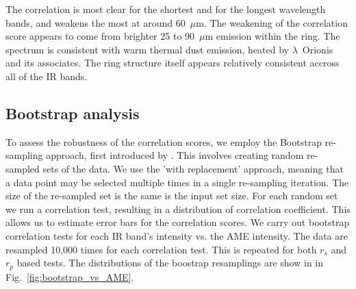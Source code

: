             The correlation is most clear for the shortest and for the longest wavelength bands, and weakens the most at around 60~$\mu$m. The weakening of the correlation score appears to come from brighter 25 to 90~$\mu$m emission within the ring. The spectrum is consistent with warm thermal dust emission, heated by $\lambda$~Orionis and its associates. The ring structure itself appears relatively consistent accross all of the IR bands.
            \subsection{Bootstrap analysis}
                To assess the robustness of the correlation scores, we employ the Bootstrap re-sampling approach, first introduced by \cite{efron79}. This involves creating random re-sampled sets of the data. We use the 'with replacement' approach, meaning that a data point may be selected multiple times in a single re-sampling iteration. The size of the re-sampled set is the same is the input set size. For each random set we run a correlation test, resulting in a distribution of correlation coefficient. This allows us to estimate error bars for the correlation scores.
                We carry out bootstrap correlation tests for each IR band's intensity vs. the AME intensity. The data are resampled 10,000 times for each correlation test. This is repeated for both $r_{s}$ and $r_{p}$ based tests. The distributions of the boostrap resamplings are show in in Fig.~\ref{fig:bootstrap_vs_AME}.

